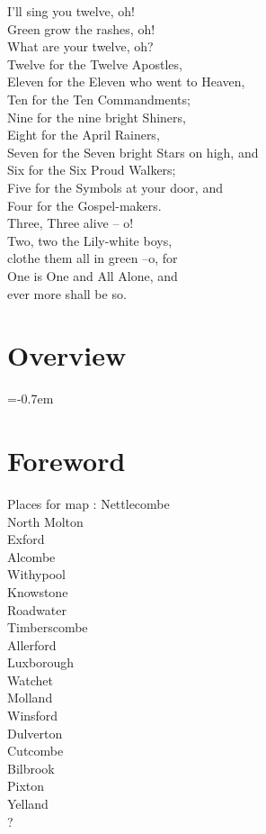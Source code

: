 \documentclass[11pt]{book}
\newlength\rulew
\renewcommand{\headrulewidth}{0pt} %
\begin{document}
I’ll sing you twelve, oh!\\
Green grow the rashes, oh!\\
What are your twelve, oh?\\
Twelve for the Twelve Apostles,\\
Eleven for the Eleven who went to Heaven,\\
Ten for the Ten Commandments;\\
Nine for the nine bright Shiners,\\
Eight for the April Rainers,\\
Seven for the Seven bright Stars on high, and\\
Six for the Six Proud Walkers;\\
Five for the Symbols at your door, and\\
Four for the Gospel-makers.\\
Three, Three alive – o!\\
Two, two the Lily-white boys,\\
 clothe them all in green –o, for\\
One is One and All Alone, and\\
 ever more shall be so. \\
\vfill
\hspace{0pt}
\pagebreak

\chapter*{Overview}




\parskip=-0.7em %
\tableofcontents

\mainmatter	

\setlength{\parskip}{0.5em} %

\fancyhf{}
\renewcommand{\headrulewidth}{0.2pt} %
\fancyhead[RO]{\leftmark}
\fancyfoot[CE,CO]{\thepage}


\chapter*{Foreword}

Places for map :
Nettlecombe\\
North Molton\\
Exford\\
Alcombe\\
Withypool\\
Knowstone\\
Roadwater\\
Timberscombe\\
Allerford\\
Luxborough\\
Watchet\\
Molland\\
Winsford\\
Dulverton\\
Cutcombe\\
Bilbrook\\
Pixton\\
Yelland\\ ? 
\end{document}
